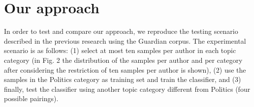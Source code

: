 \chapter{Our approach}


In order to test and compare our approach, we reproduce the testing scenario
described in the previous research \cite{stamatatos2013robustness} using the Guardian corpus. The experimental
scenario is as follows: (1) select at most ten samples per author in each topic category
(in Fig. 2 the distribution of the samples per author and per category after considering
the restriction of ten samples per author is shown), (2) use the samples in the Politics category as training set and train the classifier, and (3) finally, test the classifier using
another topic category different from Politics (four possible pairings).